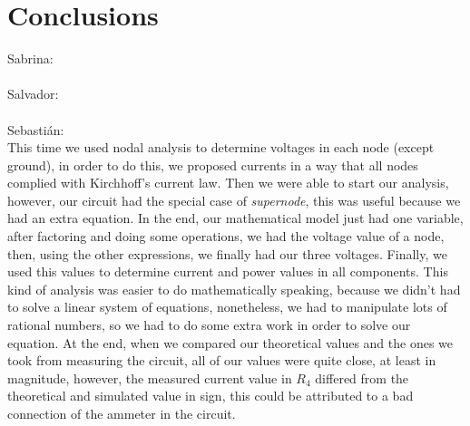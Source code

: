 \documentclass[letterpaper]{article}
\begin{document}
\section{Conclusions}
{\large Sabrina:}\\
%
\\[2ex]
{\large Salvador:}\\
%
\\[2ex]
{\large Sebastián:}\\
This time we used nodal analysis to determine voltages in each node (except ground), 
in order to do this, we proposed currents in a way that all nodes complied with Kirchhoff's
current law. Then we were able to start our analysis, however, our circuit had the special
case of \textit{supernode}, this was useful because we had an extra equation. In the
end, our mathematical model just had one variable, after factoring and doing some
operations, we had the voltage value of a node, then, using the other expressions, we
finally had our three voltages. Finally, we used this values to determine current and power
values in all components. 
This kind of analysis was easier to do mathematically speaking, because we
didn't had to solve a linear system of equations, nonetheless, we had to manipulate lots
of rational numbers, so we had to do some extra work in order to solve our equation.
At the end, when we compared our theoretical values and the ones we took from measuring the
circuit, all of our values were quite close, at least in magnitude, however, the measured
current value in $R_4$ differed from the theoretical and simulated value in sign, this could be
attributed to a bad connection of the ammeter in the circuit. 
\end{document}
